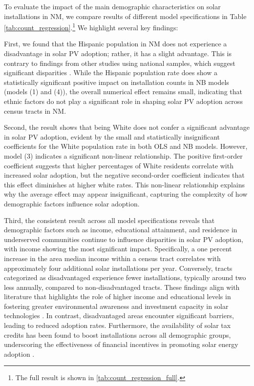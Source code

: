 \documentclass[11pt,twoside,letterpaper]{article}
\begin{document}
To evaluate the impact of the main demographic characteristics on solar installations in NM, we compare results of different model specifications in Table \ref{tab:count_regression}.\footnote{The full result is shown in \autoref{tab:count_regression_full}.} We highlight several key findings: 

First, we found that the Hispanic population in NM does not experience a disadvantage in solar PV adoption; rather, it has a slight advantage. This is contrary to findings from other studies using national samples, which suggest significant disparities \parencite{gao_solar_2022, darghouth_characterizing_2022}. While the Hispanic population rate does show a statistically significant positive impact on installation counts in NB models (models (1) and (4)), the overall numerical effect remains small, indicating that ethnic factors do not play a significant role in shaping solar PV adoption across census tracts in NM.

Second, the result shows that being White does not confer a significant advantage in solar PV adoption, evident by the small and statistically insignificant coefficients for the White population rate in both OLS and NB models. However, model (3) indicates a significant non-linear relationship. The positive first-order coefficient suggests that higher percentages of White residents correlate with increased solar adoption, but the negative second-order coefficient indicates that this effect diminishes at higher white rates. This non-linear relationship explains why the average effect may appear insignificant, capturing the complexity of how demographic factors influence solar adoption.

Third, the consistent result across all model specifications reveals that demographic factors such as income, educational attainment, and residence in underserved communities continue to influence disparities in solar PV adoption, with income showing the most significant impact. Specifically, a one percent increase in the area median income within a census tract correlates with approximately four additional solar installations per year. Conversely, tracts categorized as disadvantaged experience fewer installations, typically around two less annually, compared to non-disadvantaged tracts. These findings align with literature that highlights the role of higher income and educational levels in fostering greater environmental awareness and investment capacity in solar technologies \parencite{oshaughnessy_income-targeted_2021, darghouth_characterizing_2022}. In contrast, disadvantaged areas encounter significant barriers, leading to reduced adoption rates. Furthermore, the availability of solar tax credits has been found to boost installations across all demographic groups, underscoring the effectiveness of financial incentives in promoting solar energy adoption \parencite{borenstein_private_2017}. 
\end{document}
